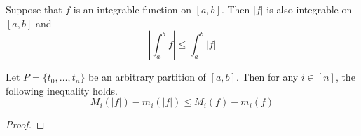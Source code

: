 \documentclass[../main.tex]{subfiles}
\begin{document}
\begin{theorem}\label{trm:13.26}
    Suppose that $f$ is an integrable function on $[a,b]$. Then $|f|$ is also integrable on $[a,b]$ and
    \begin{equation*}
        \left| \int_a^bf \right| \leq \int_a^b|f|
    \end{equation*}
    \begin{lemma*}
        Let $P=\{t_0,\dots,t_n\}$ be an arbitrary partition of $[a,b]$. Then for any $i\in[n]$, the following inequality holds.
        \begin{equation*}
            M_i(|f|)-m_i(|f|) \leq M_i(f)-m_i(f)
        \end{equation*}
        \begin{proof}

\end{proof}
\end{lemma*}
\end{theorem}
\end{document}
